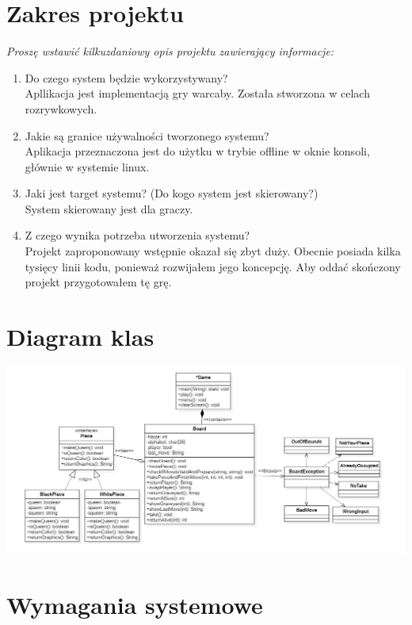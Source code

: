 \documentclass{article}
\begin{document}
\makeheader

\section{Zakres projektu}
 {\small\it Proszę wstawić kilkuzdaniowy opis projektu zawierający informacje:
  \begin{enumerate}
    \item Do czego system będzie wykorzystywany?
          \\
          \textup{Apllikacja jest implementacją gry warcaby. Została stworzona w celach rozrywkowych.}
    \item Jakie są granice używalności tworzonego systemu?
          \\
          \textup{Aplikacja przeznaczona jest do użytku w trybie offline w oknie konsoli, głównie w systemie linux.}
    \item Jaki jest target systemu? (Do kogo system jest skierowany?)
          \\
          \textup{System skierowany jest dla graczy.}
    \item Z czego wynika potrzeba utworzenia systemu?
          \\
          \textup{Projekt zaproponowany wstępnie okazał się zbyt duży. Obecnie posiada kilka tysięcy linii kodu, ponieważ rozwijałem jego koncepcję. Aby oddać skończony projekt przygotowałem tę grę.}
  \end{enumerate}}
\section{Diagram klas}

\includegraphics[width=\textwidth]{PO_Java.png}

\section{Wymagania systemowe}
\end{document}
